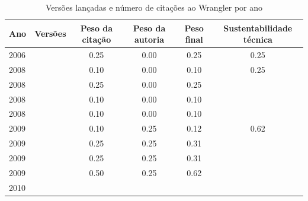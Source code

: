 \begin{table}[H]
\caption{Versões lançadas e número de citações ao Wrangler por ano}
\centering
\begin{tabular}{| l | c | c | c | c | c |}
  \hline
  Ano & Versões & Peso da citação & Peso da autoria & Peso final & Sustentabilidade técnica \\
  \hline
            2006
          &
          
          &
          0.25
          &
          0.00
          &
          0.25
          &
            {\color{red} 0.25}
          \\
\hline
            2008
          &
          
          &
          0.10
          &
          0.00
          &
          0.10
          &
            {\color{red} 0.25}
          \\
            2008
          &
          
          &
          0.25
          &
          0.00
          &
          0.25
          &
          \\
            2008
          &
          
          &
          0.10
          &
          0.00
          &
          0.10
          &
          \\
            2008
          &
          
          &
          0.10
          &
          0.00
          &
          0.10
          &
          \\
\hline
            2009
          &
          
          &
          0.10
          &
          0.25
          &
          0.12
          &
            {\color{blue} 0.62}
          \\
            2009
          &
          
          &
          0.25
          &
          0.25
          &
          0.31
          &
          \\
            2009
          &
          
          &
          0.25
          &
          0.25
          &
          0.31
          &
          \\
            2009
          &
          
          &
          0.50
          &
          0.25
          &
          0.62
          &
          \\
\hline
            2010
          &
          

\end{tabular}
\end{table}
